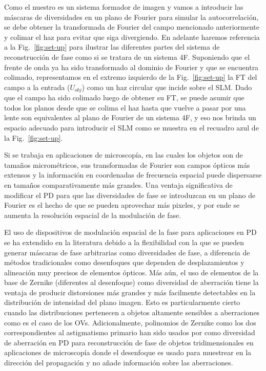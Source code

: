 Como el nuestro es un sistema formador de imagen y vamos a introducir las
máscaras de diversidades en un plano de Fourier para simular la
autocorrelación, se debe obtener la transformada de Fourier del campo
mencionado anteriormente y colimar el haz para evitar que siga
divergiendo. En adelante haremos 
referencia a la Fig.~\ref{fig:set-up} para ilustrar las diferentes
partes del sistema de reconstrucción de fase como si se tratara de
un sistema 4F.
Suponiendo que el frente de onda ya ha sido transformado al dominio de Fourier y que se
encuentra colimado, representamos en el extremo izquierdo de la Fig.~\ref{fig:set-up} la FT del campo a la entrada ($U_{obj}$) como un haz
circular que incide sobre el SLM.  Dado que el campo ha sido
colimado luego de obtener su FT, se puede asumir que todos los planos desde que
se colima el haz hasta que vuelve a pasar por una lente son
equivalentes al plano de Fourier de un sistema 4F, y eso nos brinda un
espacio adecuado para introducir el SLM como se muestra en el recuadro
azul de la Fig.~\ref{fig:set-up}. 

Si se trabaja en aplicaciones de microscopía, en las cuales los objetos
son de tamaños micrométricos, sus transformadas de Fourier son campos
ópticos más extensos y la información en coordenadas de frecuencia
espacial puede dispersarse en tamaños comparativamente más
grandes. Una ventaja significativa de modificar el PD para que las
diversidades de fase se introduzcan en un plano de Fourier es el hecho
de que se pueden aprovechar más pixeles, y por ende se aumenta la
resolución espacial de la modulación de fase. 


El uso de dispositivos de modulación espacial de la fase para
aplicaciones en PD se ha extendido en la literatura
debido a la flexibilidad con la que se pueden generar máscaras de fase
arbitrarias como diversidades de fase, a diferencia de métodos
tradicionales como desenfoques que dependen de desplazamientos y alineación muy
precisos de elementos ópticos. Más aún, el uso de elementos de
la base de Zernike (diferentes al desenfoque) como diversidad de aberración tiene la ventaja de
producir distorsiones más grandes y más facilmente detectables en la
distribución de intensidad del plano imagen. Esto es particularmente
cierto cuando las distribuciones pertenecen a objetos altamente
sensibles a aberraciones como es el caso de los OVs. Adicionalmente, polinomios de
Zernike como los dos correspondientes al astigmatismo primario han
sido usados por  como diversidad de aberración en
PD para reconstrucción de fase de objetos tridimensionales en
aplicaciones de microscopía donde el desenfoque es usado para
muestrear en la dirección del propagación y no añade información
sobre las aberraciones.  
 

